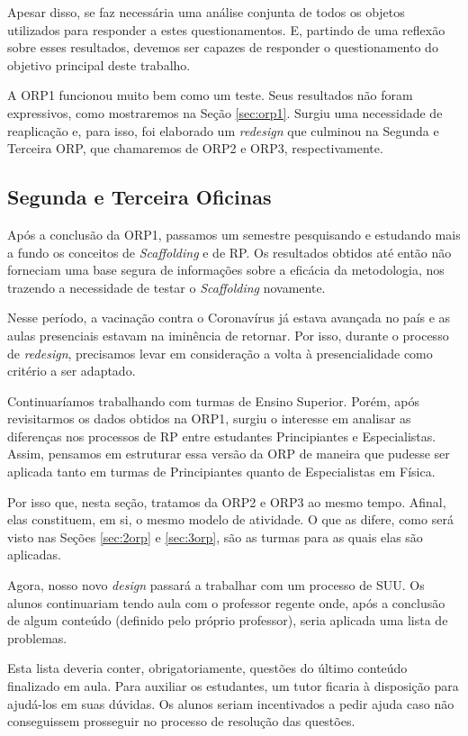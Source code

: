 Apesar disso, se faz necessária uma análise conjunta de todos os objetos utilizados para responder a estes questionamentos. E, partindo de uma reflexão sobre esses resultados, devemos ser capazes de responder o questionamento do objetivo principal deste trabalho.

A ORP1 funcionou muito bem como um teste. Seus resultados não foram expressivos, como mostraremos na Seção \ref{sec:orp1}. Surgiu uma necessidade de reaplicação e, para isso, foi elaborado um \textit{redesign} que culminou na Segunda e Terceira ORP, que chamaremos de ORP2 e ORP3, respectivamente.

\subsection{Segunda e Terceira Oficinas} \label{sec:orp2e3}

Após a conclusão da ORP1, passamos um semestre pesquisando e estudando mais a fundo os conceitos de \textit{Scaffolding} e de RP. Os resultados obtidos até então não forneciam uma base segura de informações sobre a eficácia da metodologia, nos trazendo a necessidade de testar o \textit{Scaffolding} novamente.

Nesse período, a vacinação contra o Coronavírus já estava avançada no país e as aulas presenciais estavam na iminência de retornar. Por isso, durante o processo de \textit{redesign}, precisamos levar em consideração a volta à presencialidade como critério a ser adaptado.

Continuaríamos trabalhando com turmas de Ensino Superior. Porém, após revisitarmos os dados obtidos na ORP1, surgiu o interesse em analisar as diferenças nos processos de RP entre estudantes Principiantes e Especialistas. Assim, pensamos em estruturar essa versão da ORP de maneira que pudesse ser aplicada tanto em turmas de Principiantes quanto de Especialistas em Física.

Por isso que, nesta seção, tratamos da ORP2 e ORP3 ao mesmo tempo. Afinal, elas constituem, em si, o mesmo modelo de atividade. O que as difere, como será visto nas Seções \ref{sec:2orp} e \ref{sec:3orp}, são as turmas para as quais elas são aplicadas.

Agora, nosso novo \textit{design} passará a trabalhar com um processo de SUU. Os alunos continuariam tendo aula com o professor regente onde, após a conclusão de algum conteúdo (definido pelo próprio professor), seria aplicada uma lista de problemas.

Esta lista deveria conter, obrigatoriamente, questões do último conteúdo finalizado em aula. Para auxiliar os estudantes, um tutor ficaria à disposição para ajudá-los em suas dúvidas. Os alunos seriam incentivados a pedir ajuda caso não conseguissem prosseguir no processo de resolução das questões.


